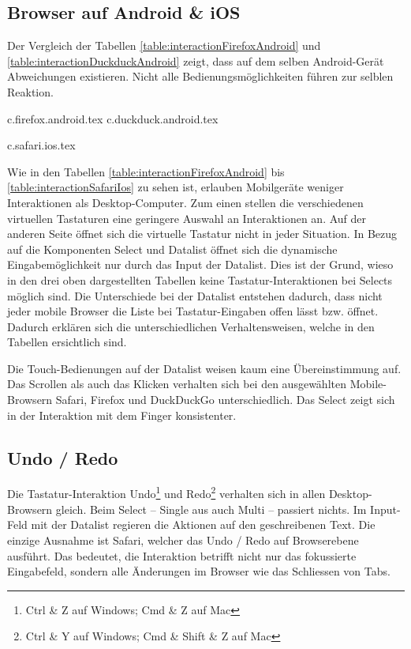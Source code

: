 \clearpage
\subsection{Browser auf Android \& iOS}
\label{sec:mobileBrowser}

Der Vergleich der Tabellen \ref{table:interactionFirefoxAndroid} und \ref{table:interactionDuckduckAndroid} zeigt, dass auf dem selben Android-Gerät Abweichungen existieren.
Nicht alle Bedienungsmöglichkeiten führen zur selblen Reaktion.

{c.firefox.android.tex}
{c.duckduck.android.tex}

\clearpage
{c.safari.ios.tex}

Wie in den Tabellen \ref{table:interactionFirefoxAndroid} bis \ref{table:interactionSafariIos} zu sehen ist, erlauben Mobilgeräte weniger Interaktionen als Desktop-Computer.
Zum einen stellen die verschiedenen virtuellen Tastaturen eine geringere Auswahl an Interaktionen an.
Auf der anderen Seite öffnet sich die virtuelle Tastatur nicht in jeder Situation. 
In Bezug auf die Komponenten Select und Datalist öffnet sich die dynamische Eingabemöglichkeit nur durch das Input der Datalist.
Dies ist der Grund, wieso in den drei oben dargestellten Tabellen keine Tastatur-Interaktionen bei Selects möglich sind. 
Die Unterschiede bei der Datalist entstehen dadurch, dass nicht jeder mobile Browser die Liste bei Tastatur-Eingaben offen lässt bzw. öffnet.
Dadurch erklären sich die unterschiedlichen Verhaltensweisen, welche in den Tabellen ersichtlich sind.

Die Touch-Bedienungen auf der Datalist weisen kaum eine Übereinstimmung auf. 
Das Scrollen als auch das Klicken verhalten sich bei den ausgewählten Mobile-Browsern Safari, Firefox und DuckDuckGo unterschiedlich.
Das Select zeigt sich in der Interaktion mit dem Finger konsistenter. 


\subsection{Undo / Redo}
\label{sec:undoRedo}

Die Tastatur-Interaktion Undo\footnote{
    Ctrl \& Z auf Windows; Cmd \& Z auf Mac
} und Redo\footnote{
    Ctrl \& Y auf Windows; Cmd \& Shift \& Z auf Mac
} verhalten sich in allen Desktop-Browsern gleich.
Beim Select – Single aus auch Multi – passiert nichts.
Im Input-Feld mit der Datalist regieren die Aktionen auf den geschreibenen Text.
Die einzige Ausnahme ist Safari, welcher das Undo / Redo auf Browserebene ausführt.
Das bedeutet, die Interaktion betrifft nicht nur das fokussierte Eingabefeld, sondern alle Änderungen im Browser wie das Schliessen von Tabs.

